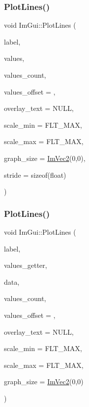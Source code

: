 \mbox{\label{namespace_im_gui_a2bc21c56e4796855313804086cca114f}} 
\subsubsection{\texorpdfstring{Plot\+Lines()}{PlotLines()}\hspace{0.1cm}{\footnotesize\ttfamily [1/2]}}
{\footnotesize\ttfamily void Im\+Gui\+::\+Plot\+Lines (\begin{DoxyParamCaption}\item[{const char $\ast$}]{label,  }\item[{const float $\ast$}]{values,  }\item[{int}]{values\+\_\+count,  }\item[{int}]{values\+\_\+offset = {},  }\item[{const char $\ast$}]{overlay\+\_\+text = {\ttfamily NULL},  }\item[{float}]{scale\+\_\+min = {\ttfamily FLT\+\_\+MAX},  }\item[{float}]{scale\+\_\+max = {\ttfamily FLT\+\_\+MAX},  }\item[{\mbox{\hyperlink{struct_im_vec2}{Im\+Vec2}}}]{graph\+\_\+size = {\ttfamily \mbox{\hyperlink{struct_im_vec2}{Im\+Vec2}}(0,0)},  }\item[{int}]{stride = {\ttfamily sizeof(float)} }\end{DoxyParamCaption})}

\mbox{\label{namespace_im_gui_a94a2645d45c96da35b834dc7db93a9f1}} 
\subsubsection{\texorpdfstring{Plot\+Lines()}{PlotLines()}\hspace{0.1cm}{\footnotesize\ttfamily [2/2]}}
{\footnotesize\ttfamily void Im\+Gui\+::\+Plot\+Lines (\begin{DoxyParamCaption}\item[{const char $\ast$}]{label,  }\item[{float($\ast$)(void $\ast$data, int idx)}]{values\+\_\+getter,  }\item[{void $\ast$}]{data,  }\item[{int}]{values\+\_\+count,  }\item[{int}]{values\+\_\+offset = {},  }\item[{const char $\ast$}]{overlay\+\_\+text = {\ttfamily NULL},  }\item[{float}]{scale\+\_\+min = {\ttfamily FLT\+\_\+MAX},  }\item[{float}]{scale\+\_\+max = {\ttfamily FLT\+\_\+MAX},  }\item[{\mbox{\hyperlink{struct_im_vec2}{Im\+Vec2}}}]{graph\+\_\+size = {\ttfamily \mbox{\hyperlink{struct_im_vec2}{Im\+Vec2}}(0,0)} }\end{DoxyParamCaption})}

